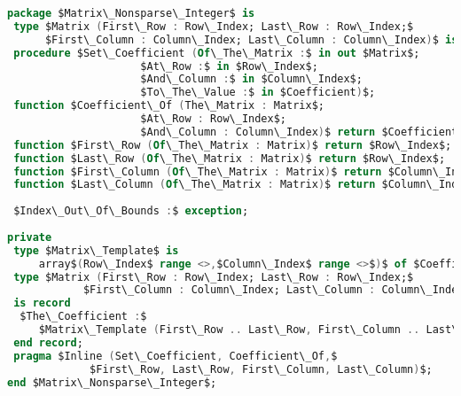 \begin{lstlisting}[mathescape=true, language=Ada, frame=lbr]
package $Matrix\_Nonsparse\_Integer$ is
 type $Matrix (First\_Row : Row\_Index; Last\_Row : Row\_Index;$
      $First\_Column : Column\_Index; Last\_Column : Column\_Index)$ is private;
 procedure $Set\_Coefficient (Of\_The\_Matrix :$ in out $Matrix$;
                     $At\_Row :$ in $Row\_Index$;
                     $And\_Column :$ in $Column\_Index$;
                     $To\_The\_Value :$ in $Coefficient)$;
 function $Coefficient\_Of (The\_Matrix : Matrix$;
                     $At\_Row : Row\_Index$;
                     $And\_Column : Column\_Index)$ return $Coefficient$;            
 function $First\_Row (Of\_The\_Matrix : Matrix)$ return $Row\_Index$;
 function $Last\_Row (Of\_The\_Matrix : Matrix)$ return $Row\_Index$;
 function $First\_Column (Of\_The\_Matrix : Matrix)$ return $Column\_Index$;
 function $Last\_Column (Of\_The\_Matrix : Matrix)$ return $Column\_Index$;
 
 $Index\_Out\_Of\_Bounds :$ exception;
 
private
 type $Matrix\_Template$ is
     array$(Row\_Index$ range <>,$Column\_Index$ range <>$)$ of $Coefficient$;
 type $Matrix (First\_Row : Row\_Index; Last\_Row : Row\_Index;$
            $First\_Column : Column\_Index; Last\_Column : Column\_Index)$
 is record
  $The\_Coefficient :$
     $Matrix\_Template (First\_Row .. Last\_Row, First\_Column .. Last\_Column)$;
 end record;
 pragma $Inline (Set\_Coefficient, Coefficient\_Of,$
             $First\_Row, Last\_Row, First\_Column, Last\_Column)$;
end $Matrix\_Nonsparse\_Integer$;
\end{lstlisting}

